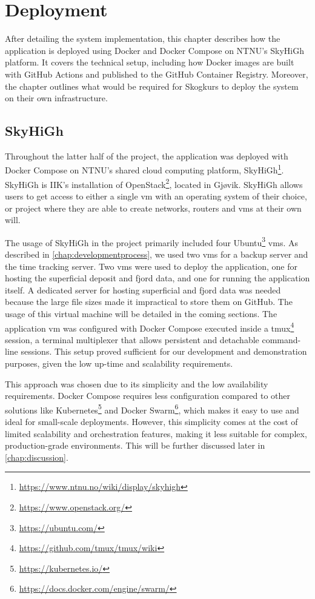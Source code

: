\chapter{Deployment}\label{chap:deployment}

After detailing the system implementation, this chapter describes how the application is deployed using Docker and Docker Compose on NTNU's SkyHiGh platform. It covers the technical setup, including how Docker images are built with GitHub Actions and published to the GitHub Container Registry. Moreover, the chapter outlines what would be required for Skogkurs to deploy the system on their own infrastructure.

\section{SkyHiGh}

Throughout the latter half of the project, the application was deployed with Docker Compose on NTNU's shared cloud computing platform, SkyHiGh\footnote{\url{https://www.ntnu.no/wiki/display/skyhigh}}. SkyHiGh is IIK's installation of OpenStack\footnote{\url{https://www.openstack.org/}}, located in Gjøvik. SkyHiGh allows users to get access to either a single \acrfull{vm} with an operating system of their choice, or project where they are able to create networks, routers and \acrshort{vm}s at their own will.

The usage of SkyHiGh in the project primarily included four Ubuntu\footnote{\url{https://ubuntu.com/}} \acrshort{vm}s. As described in \autoref{chap:developmentprocess}, we used two \acrshort{vm}s for a backup server and the time tracking server. Two \acrshort{vm}s were used to deploy the application, one for hosting the superficial deposit and fjord data, and one for running the application itself. A dedicated server for hosting superficial and fjord data was needed because the large file sizes made it impractical to store them on GitHub. The usage of this virtual machine will be detailed in the coming sections. The application \acrshort{vm} was configured with Docker Compose executed inside a tmux\footnote{\url{https://github.com/tmux/tmux/wiki}} session, a terminal multiplexer that allows persistent and detachable command-line sessions. This setup proved sufficient for our development and demonstration purposes, given the low up-time and scalability requirements.

This approach was chosen due to its simplicity and the low availability requirements. Docker Compose requires less configuration compared to other solutions like Kubernetes\footnote{\url{https://kubernetes.io/}} and Docker Swarm\footnote{\url{https://docs.docker.com/engine/swarm/}}, which makes it easy to use and ideal for small-scale deployments. However, this simplicity comes at the cost of limited scalability and orchestration features, making it less suitable for complex, production-grade environments. This will be further discussed later in \autoref{chap:discussion}.

